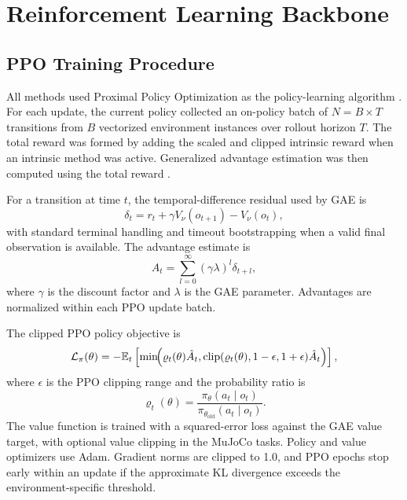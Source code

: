 \section{Reinforcement Learning Backbone}
\label{sec:methodology_reinforcement_learning_backbone}

\subsection{PPO Training Procedure}
\label{subsec:methodology_ppo_training_procedure}

All methods used Proximal Policy Optimization as the policy-learning algorithm \parencite{schulman-2017}.
For each update, the current policy collected an on-policy batch of $N=B\times T$ transitions from $B$ vectorized environment instances over rollout horizon $T$.
The total reward was formed by adding the scaled and clipped intrinsic reward when an intrinsic method was active.
Generalized advantage estimation was then computed using the total reward \parencite{schulman-2015}.

For a transition at time $t$, the temporal-difference residual used by GAE is
\begin{equation}
    \delta_t
    = r_t + \gamma V_\nu(o_{t+1}) - V_\nu(o_t),
\end{equation}
with standard terminal handling and timeout bootstrapping when a valid final observation is available.
The advantage estimate is
\begin{equation}
    \hat{A}_t
    = \sum_{l=0}^{\infty}(\gamma\lambda)^l\delta_{t+l},
\end{equation}
where $\gamma$ is the discount factor and $\lambda$ is the GAE parameter.
Advantages are normalized within each PPO update batch.

The clipped PPO policy objective is
\begin{equation}
    \mathcal{L}_{\pi}(\theta)
    = -\mathbb{E}_t\left[
        \min\!\Bigl(\varrho_t(\theta)\hat{A}_t,
            \mathrm{clip}(\varrho_t(\theta),1-\epsilon,1+\epsilon)\hat{A}_t
        \Bigr)
    \right],
\end{equation}
where $\epsilon$ is the PPO clipping range and the probability ratio is
\begin{equation}
    \varrho_t(\theta)
    = \frac{\pi_\theta(a_t\mid o_t)}{\pi_{\theta_{\mathrm{old}}}(a_t\mid o_t)}.
\end{equation}
The value function is trained with a squared-error loss against the GAE value target, with optional value clipping in the MuJoCo tasks.
Policy and value optimizers use Adam.
Gradient norms are clipped to 1.0, and PPO epochs stop early within an update if the approximate KL divergence exceeds the environment-specific threshold.

